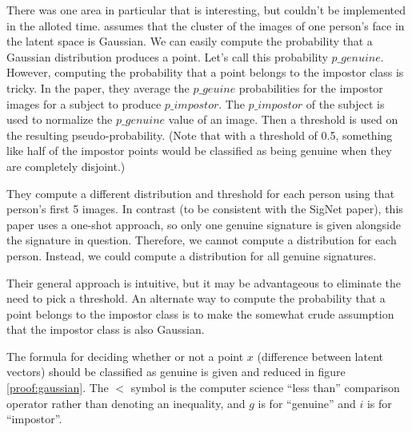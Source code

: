 
There was one area in particular that is interesting, but couldn't be implemented in the alloted time.
\cite{LeCun} assumes that the cluster of the images of one person's face in the latent space is Gaussian.
We can easily compute the probability that a Gaussian distribution produces a point.
Let's call this probability $p\_genuine$.
However, computing the probability that a point belongs to the impostor class is tricky.
In the paper, they average the $p\_geuine$ probabilities for the impostor images for a subject to produce $p\_impostor$.
The $p\_impostor$ of the subject is used to normalize the $p\_genuine$ value of an image.
Then a threshold is used on the resulting pseudo-probability.
(Note that with a threshold of 0.5, something like half of the impostor points would be classified as being genuine when they are completely disjoint.)

They compute a different distribution and threshold for each person using that person's first 5 images.
In contrast (to be consistent with the SigNet paper), this paper uses a one-shot approach, so only one genuine signature is given alongside the signature in question.
Therefore, we cannot compute a distribution for each person.
Instead, we could compute a distribution for all genuine signatures.

Their general approach is intuitive, but it may be advantageous to eliminate the need to pick a threshold.
An alternate way to compute the probability that a point belongs to the impostor class is to make the somewhat crude assumption that the impostor class is also Gaussian.

The formula for deciding whether or not a point $x$ (difference between latent vectors) should be classified as genuine is given and reduced in figure \ref{proof:gaussian}.
The $<$ symbol is the computer science ``less than'' comparison operator rather than denoting an inequality, and $g$ is for ``genuine'' and $i$ is for ``impostor''.

